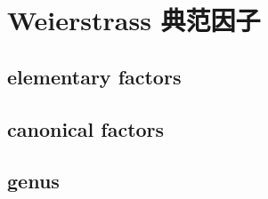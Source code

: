 \section{Weierstrass 典范因子}
\label{b3:sec:2002}


\subsection{elementary factors}
\label{b3:subsec:200201}

\subsection{canonical factors}
\label{b3:subsec:200202}

\subsection{genus}
\label{b3:subsec:200203}


